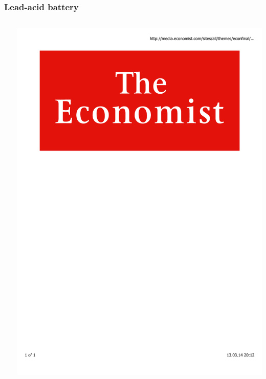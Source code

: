 \documentclass[mathserif,10pt]{beamer}
\begin{document}
\begin{frame}
    \frametitle{Lead-acid battery}
    \begin{columns}
    \begin{column}{.50\textwidth}
	\ \\
    \end{column}
    \begin{column}{.50\textwidth}
	\centering
	\includegraphics[viewport = 0 550 600 800, clip, scale=0.1]{figures/economist_logo.pdf}\\

\end{column}
\end{columns}
\end{frame}
\end{document}
